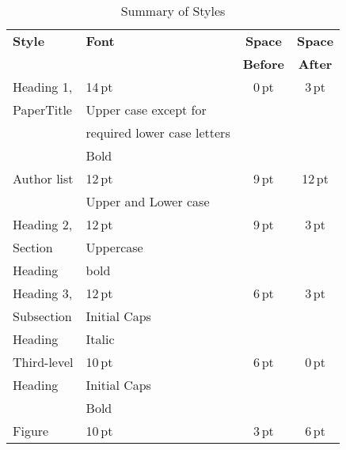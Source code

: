 \documentclass{JAC2003}
\begin{document}
\vspace*{-20pt}
\begin{table}[h]
    \setlength\tabcolsep{4pt}
    \caption{Summary of Styles}
    \label{style-tab}
    \begin{tabular}{llcc}
        \toprule
        \textbf{Style} & \textbf{Font}               & \textbf{Space}  & \textbf{Space} \\
                       &                             & \textbf{Before} & \textbf{After} \\ 
        \midrule
         Heading 1,        & 14\,pt                      & 0\,pt           & 3\,pt  \\
          PaperTitle             & Upper case except for       &                 &      \\
                       & required lower case letters &                 &      \\   %
                       & Bold                        &                 &      \\ 
         \midrule
          Author list  & 12\,pt                      & 9\,pt           & 12\,pt \\
                       & Upper and Lower case        &                 &      \\ 
         \midrule
         Heading 2, & 12\,pt                      & 9\,pt           & 3\,pt  \\
         Section       & Uppercase                   &                 &      \\
         Heading              & bold                        &                 &      \\ 
        \midrule
         Heading 3,   & 12\,pt                      & 6\,pt           & 3\,pt  \\
         Subsection       & Initial Caps                &                 &      \\
         Heading              & Italic                      &                 &      \\ 
        \midrule
         Third-level   & 10\,pt                      & 6\,pt           & 0\,pt  \\
         Heading       & Initial Caps                &                 &      \\
                             & Bold                      &                 &      \\ 
        \midrule
         Figure        & 10\,pt                      & 3\,pt           & 6\,pt  \\

\end{tabular}
\end{table}
\end{document}
